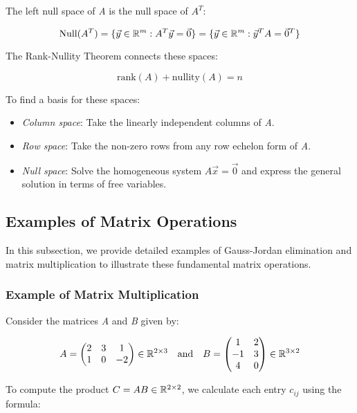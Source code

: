 The left null space of \emph{A} is the null space of \(A^T\):

\[
    \text{Null}(A^T) = \{\vec{y} \in \mathbb{R}^m : A^T\vec{y} = \vec{0}\} = \{\vec{y} \in \mathbb{R}^m : \vec{y}^T A = \vec{0}^T\}
\]

The Rank-Nullity Theorem connects these spaces:

\[
    \text{rank}(A) + \text{nullity}(A) = n
\]

To find a basis for these spaces:

\begin{itemize}
    \item \emph{Column space}: Take the linearly independent columns of \emph{A}.
    \item \emph{Row space}: Take the non-zero rows from any row echelon form of \emph{A}.    
    \item \emph{Null space}: Solve the homogeneous system \(A\vec{x} = \vec{0}\) and express the general 
    solution in terms of free variables.
\end{itemize}

\subsection{Examples of Matrix Operations}

In this subsection, we provide detailed examples of Gauss-Jordan elimination and matrix multiplication to illustrate these fundamental matrix operations.

\subsubsection{Example of Matrix Multiplication}

Consider the matrices \emph{A} and \emph{B} given by:

\[
    A = 
    \begin{pmatrix}
    2 & 3 & 1 \\
    1 & 0 & -2
    \end{pmatrix} \in \mathbb{R}^{2 \times 3}
    \quad \text{and} \quad
    B = 
    \begin{pmatrix}
    1 & 2 \\
    -1 & 3 \\
    4 & 0
    \end{pmatrix} \in \mathbb{R}^{3 \times 2}
\]

To compute the product \(C = AB \in \mathbb{R}^{2 \times 2}\), we calculate each entry \(c_{ij}\) using the formula:

